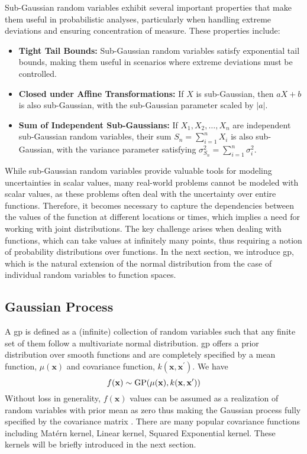 Sub-Gaussian random variables exhibit several important properties that make them useful in probabilistic analyses, particularly when handling extreme deviations and ensuring concentration of measure. These properties include:  
\begin{itemize}
    \item \textbf{Tight Tail Bounds:} Sub-Gaussian random variables satisfy exponential tail bounds, making them useful in scenarios where extreme deviations must be controlled.  
    \item \textbf{Closed under Affine Transformations:} If \( X \) is sub-Gaussian, then \( aX + b \) is also sub-Gaussian, with the sub-Gaussian parameter scaled by \( \vert a \vert \).  
    \item \textbf{Sum of Independent Sub-Gaussians:} If \( X_1, X_2, \dots, X_n \) are independent sub-Gaussian random variables, their sum \( S_n = \sum_{i=1}^n X_i \) is also sub-Gaussian, with the variance parameter satisfying \( \sigma^2_{S_n} = \sum_{i=1}^n \sigma_i^2 \).  
\end{itemize} 

While sub-Gaussian random variables provide valuable tools for modeling uncertainties in scalar values, many real-world problems cannot be modeled with scalar values, as these problems often deal with the uncertainty over entire functions. Therefore, it becomes necessary to capture the dependencies between the values of the function at different locations or times, which implies a need for working with joint distributions. The key challenge arises when dealing with functions, which can take values at infinitely many points, thus requiring a notion of probability distributions over functions. In the next section,  we introduce \acf{gp}, which is the natural extension of the normal distribution from the case of individual random variables to function spaces.

\subsection{Gaussian Process}
\label{section:gaussian_process}
A \acf{gp} is defined as a (infinite) collection of random variables such that any finite set of them follow a multivariate normal distribution. \ac{gp} offers a prior distribution over smooth functions and are completely specified by a mean function, $\mu(\mathbf{x})$ and covariance function, $k(\mathbf{x}, \mathbf{x}^\prime)$. We have \begin{equation*}
    \label{def:GP}
    f({\bf x})\sim\mathrm{GP}(\mu({\bf x}),k({\bf x},{\bf x}^\prime))
\end{equation*}
Without loss in generality, $f(\mathbf{x})$ values can be assumed as a realization of random variables with prior mean as zero thus making the Gaussian process fully specified by the covariance matrix \citep{rasmussen2006gaussian}. There are many popular covariance functions including Mat\'ern kernel, Linear kernel, Squared Exponential kernel. These kernels will be briefly introduced in the next section.

